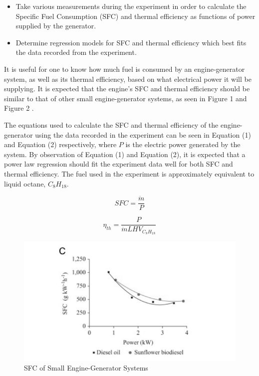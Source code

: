 \documentclass[12pt]{article}
\begin{document}
\begin{itemize}

\item Take various measurements during the experiment in order to calculate the Specific Fuel Consumption (SFC) and thermal efficiency as functions of power supplied by the generator.
\item Determine regression models for SFC and thermal efficiency which best fits the data recorded from the experiment.

\end{itemize}


It is useful for one to know how much fuel is consumed by an engine-generator system, as well as its thermal efficiency, based on what electrical power it will be supplying. It is expected that the engine's SFC and thermal efficiency should be similar to that of other small engine-generator systems, as seen in Figure 1 and Figure 2 \cite{Silva}. 
\bigskip

The equations used to calculate the SFC and thermal efficiency of the engine-generator using the data recorded in the experiment can be seen in Equation (1) and Equation (2) respectively, where $P$ is the electric power generated by the system. By observation of Equation (1) and Equation (2), it is expected that a power law regression should fit the experiment data well for both SFC and thermal efficiency. The fuel used in the experiment is approximately equivalent to liquid octane, $C_{8}H_{18}$.
\bigskip
\bigskip


\begin{equation}
SFC = \frac{\dot{m}}{P}
\end{equation}

\begin{equation}
\eta_{th} = \frac{P}{\dot{m}LHV_{C_{8}H_{18}}}
\end{equation}


\newpage


\begin{figure}[h!] %
   \centering
   \includegraphics[width=6in]{SFC_reference.JPG} 
   \caption{SFC of Small Engine-Generator Systems}
   \label{fig:example}
\end{figure}
\end{document}

